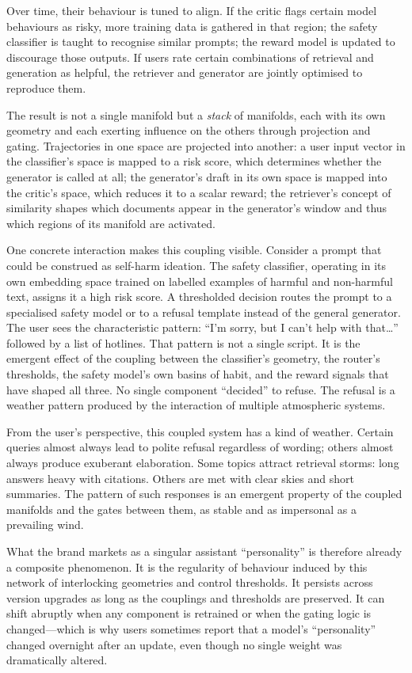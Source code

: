\documentclass[12pt,a4paper]{article}
\begin{document}
Over time, their behaviour is tuned to align. If the critic flags certain model behaviours as risky, more training data is gathered in that region; the safety classifier is taught to recognise similar prompts; the reward model is updated to discourage those outputs. If users rate certain combinations of retrieval and generation as helpful, the retriever and generator are jointly optimised to reproduce them.

The result is not a single manifold but a \emph{stack} of manifolds, each with its own geometry and each exerting influence on the others through projection and gating. Trajectories in one space are projected into another: a user input vector in the classifier's space is mapped to a risk score, which determines whether the generator is called at all; the generator's draft in its own space is mapped into the critic's space, which reduces it to a scalar reward; the retriever's concept of similarity shapes which documents appear in the generator's window and thus which regions of its manifold are activated.

One concrete interaction makes this coupling visible. Consider a prompt that could be construed as self-harm ideation. The safety classifier, operating in its own embedding space trained on labelled examples of harmful and non-harmful text, assigns it a high risk score. A thresholded decision routes the prompt to a specialised safety model or to a refusal template instead of the general generator. The user sees the characteristic pattern: ``I'm sorry, but I can't help with that\ldots'' followed by a list of hotlines. That pattern is not a single script. It is the emergent effect of the coupling between the classifier's geometry, the router's thresholds, the safety model's own basins of habit, and the reward signals that have shaped all three. No single component ``decided'' to refuse. The refusal is a weather pattern produced by the interaction of multiple atmospheric systems.

From the user's perspective, this coupled system has a kind of weather. Certain queries almost always lead to polite refusal regardless of wording; others almost always produce exuberant elaboration. Some topics attract retrieval storms: long answers heavy with citations. Others are met with clear skies and short summaries. The pattern of such responses is an emergent property of the coupled manifolds and the gates between them, as stable and as impersonal as a prevailing wind.

What the brand markets as a singular assistant ``personality'' is therefore already a composite phenomenon. It is the regularity of behaviour induced by this network of interlocking geometries and control thresholds. It persists across version upgrades as long as the couplings and thresholds are preserved. It can shift abruptly when any component is retrained or when the gating logic is changed---which is why users sometimes report that a model's ``personality'' changed overnight after an update, even though no single weight was dramatically altered.
\end{document}
